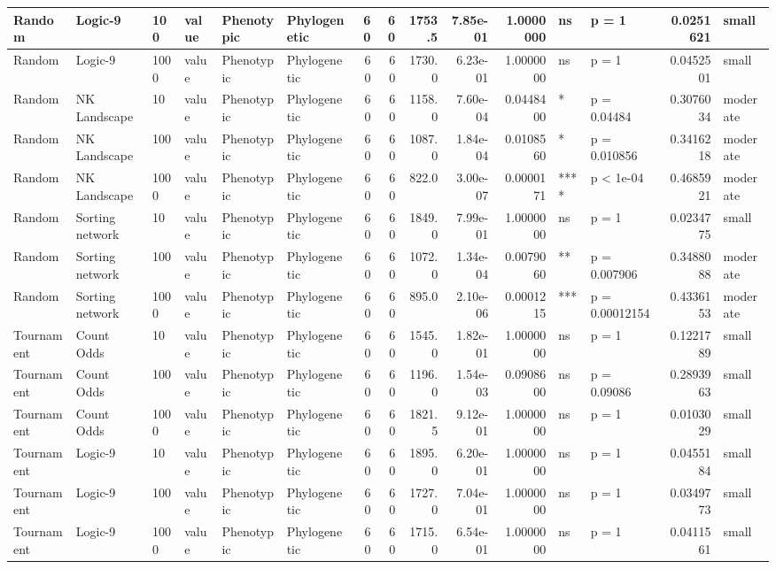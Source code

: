 \documentclass[]{book}
\begin{document}
\begin{table}
\begin{tabular}[t]{l|l|l|l|l|l|r|r|r|r|r|l|l|r|l}
\hline
Random & Logic-9 & 100 & value & Phenotypic & Phylogenetic & 60 & 60 & 1753.5 & 7.85e-01 & 1.0000000 & ns & p = 1 & 0.0251621 & small\\
\hline
Random & Logic-9 & 1000 & value & Phenotypic & Phylogenetic & 60 & 60 & 1730.0 & 6.23e-01 & 1.0000000 & ns & p = 1 & 0.0452501 & small\\
\hline
Random & NK Landscape & 10 & value & Phenotypic & Phylogenetic & 60 & 60 & 1158.0 & 7.60e-04 & 0.0448400 & * & p = 0.04484 & 0.3076034 & moderate\\
\hline
Random & NK Landscape & 100 & value & Phenotypic & Phylogenetic & 60 & 60 & 1087.0 & 1.84e-04 & 0.0108560 & * & p = 0.010856 & 0.3416218 & moderate\\
\hline
Random & NK Landscape & 1000 & value & Phenotypic & Phylogenetic & 60 & 60 & 822.0 & 3.00e-07 & 0.0000171 & **** & p < 1e-04 & 0.4685921 & moderate\\
\hline
Random & Sorting network & 10 & value & Phenotypic & Phylogenetic & 60 & 60 & 1849.0 & 7.99e-01 & 1.0000000 & ns & p = 1 & 0.0234775 & small\\
\hline
Random & Sorting network & 100 & value & Phenotypic & Phylogenetic & 60 & 60 & 1072.0 & 1.34e-04 & 0.0079060 & ** & p = 0.007906 & 0.3488088 & moderate\\
\hline
Random & Sorting network & 1000 & value & Phenotypic & Phylogenetic & 60 & 60 & 895.0 & 2.10e-06 & 0.0001215 & *** & p = 0.00012154 & 0.4336153 & moderate\\
\hline
Tournament & Count Odds & 10 & value & Phenotypic & Phylogenetic & 60 & 60 & 1545.0 & 1.82e-01 & 1.0000000 & ns & p = 1 & 0.1221789 & small\\
\hline
Tournament & Count Odds & 100 & value & Phenotypic & Phylogenetic & 60 & 60 & 1196.0 & 1.54e-03 & 0.0908600 & ns & p = 0.09086 & 0.2893963 & small\\
\hline
Tournament & Count Odds & 1000 & value & Phenotypic & Phylogenetic & 60 & 60 & 1821.5 & 9.12e-01 & 1.0000000 & ns & p = 1 & 0.0103029 & small\\
\hline
Tournament & Logic-9 & 10 & value & Phenotypic & Phylogenetic & 60 & 60 & 1895.0 & 6.20e-01 & 1.0000000 & ns & p = 1 & 0.0455184 & small\\
\hline
Tournament & Logic-9 & 100 & value & Phenotypic & Phylogenetic & 60 & 60 & 1727.0 & 7.04e-01 & 1.0000000 & ns & p = 1 & 0.0349773 & small\\
\hline
Tournament & Logic-9 & 1000 & value & Phenotypic & Phylogenetic & 60 & 60 & 1715.0 & 6.54e-01 & 1.0000000 & ns & p = 1 & 0.0411561 & small\\

\end{tabular}
\end{table}
\end{document}
